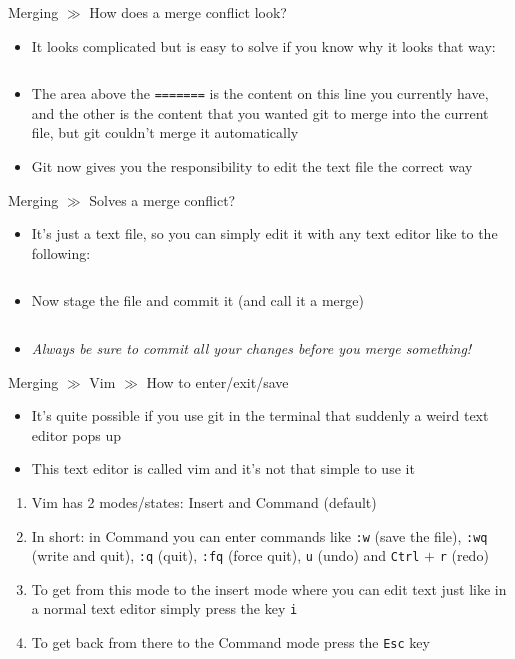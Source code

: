 \documentclass[10pt]{beamer}
\begin{document}
\begin{frame}{Merging $\gg$ How does a merge conflict look?}
	\begin{itemize}
		\item It looks complicated but is easy to solve if you know why it looks that way:
		\inputminted[bgcolor=lightGreyCustom,fontsize=\scriptsize]{diff}{./resources/git_merging_04_create_conflict_output.sh}
		\item The area above the \texttt{=======} is the content on this line you currently have, and the other is the content that you wanted git to merge into the current file, but git couldn't merge it automatically
		\item Git now gives you the responsibility to edit the text file the correct way
	\end{itemize}
\end{frame}

\begin{frame}{Merging $\gg$ Solves a merge conflict?}
\begin{itemize}
		\item It's just a text file, so you can simply edit it with any text editor like to the following:
		\inputminted[bgcolor=lightGreyCustom,fontsize=\scriptsize]{sh}{./resources/git_merging_05_create_conflict_solved.sh}
		\item Now stage the file and commit it (and call it a merge)
		\inputminted[bgcolor=lightGreyCustom,fontsize=\scriptsize]{sh}{./resources/git_merging_06_merge_commit.sh}
		\item \textit{Always be sure to commit all your changes before you merge something!}
	\end{itemize}
\end{frame}

\begin{frame}{Merging $\gg$ Vim $\gg$ How to enter/exit/save}
	\begin{itemize}
		\item It's quite possible if you use git in the terminal that suddenly a weird text editor pops up
		\item This text editor is called vim and it's not that simple to use it
	\end{itemize}
	\begin{enumerate}
		\item Vim has 2 modes/states: Insert and Command (default)
		\item In short: in Command you can enter commands like \texttt{:w} (save the file), \texttt{:wq} (write and quit), \texttt{:q} (quit), \texttt{:fq} (force quit), \texttt{u} (undo) and \texttt{Ctrl} $+$ \texttt{r} (redo)
		\item To get from this mode to the insert mode where you can edit text just like in a normal text editor simply press the key \texttt{i}
		\item To get back from there to the Command mode press the \texttt{Esc} key
	\end{enumerate}
\end{frame}
\end{document}
